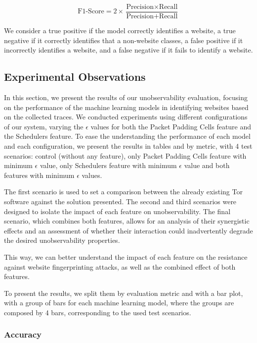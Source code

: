 \[
\text{F1-Score} = 2 \times \frac{\text{Precision} \times \text{Recall}}{\text{Precision} + \text{Recall}}
\]


We consider a true positive if the model correctly identifies a website, a true negative if it correctly identifies that a non-website classes, a false positive if it incorrectly identifies a website, and a false negative if it fails to identify a website. 

\subsection{Experimental Observations}\label{sec:experimental_observations_unobservability}

In this section, we present the results of our unobservability evaluation, focusing on the performance of the machine learning models in identifying websites based on the collected traces. We conducted experiments using different configurations of our system, varying the $\epsilon$ values for both the Packet Padding Cells feature and the Schedulers feature. To ease the understanding the performance of each model and each configuration, we present the results in tables and by metric, with 4 test scenarios: control (without any feature), only Packet Padding Cells feature with minimum $\epsilon$ value, only Schedulers feature with minimum $\epsilon$ value and both features with minimum $\epsilon$ values. 

The first scenario is used to set a comparison between the already existing Tor software against the solution presented. The second and third scenarios were designed to isolate the impact of each feature on unobservability. The final scenario, which combines both features, allows for an analysis of their synergistic effects and an assessment of whether their interaction could inadvertently degrade the desired unobservability properties.

This way, we can better understand the impact of each feature on the resistance against website fingerprinting attacks, as well as the combined effect of both features.

To present the results, we split them by evaluation metric and with a bar plot, with a group of bars for each machine learning model, where the groups are composed by 4 bars, corresponding to the used test scenarios.

\subsubsection{Accuracy}

